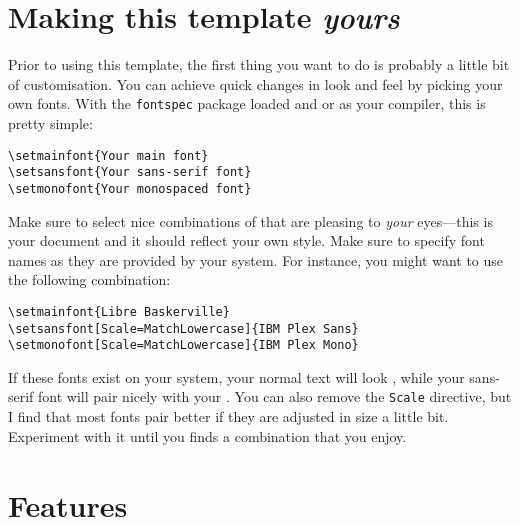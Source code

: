 \section{Making this template \emph{yours}}

Prior to using this template, the first thing you want to do is probably
a little bit of customisation. You can achieve quick changes in look and
feel by picking your own fonts. With the \verb|fontspec| package loaded
and  \XeLaTeX or \LuaLaTeX as your compiler, this is pretty simple:
%
\begin{verbatim}
\setmainfont{Your main font}
\setsansfont{Your sans-serif font}
\setmonofont{Your monospaced font}
\end{verbatim}
%
Make sure to select nice combinations of that are pleasing to
\emph{your} eyes---this is your document and it should reflect your own
style. Make sure to specify font names as they are provided by your
system. For instance, you might want to use the following combination:
%
\begin{verbatim}
\setmainfont{Libre Baskerville}
\setsansfont[Scale=MatchLowercase]{IBM Plex Sans}
\setmonofont[Scale=MatchLowercase]{IBM Plex Mono}
\end{verbatim}
%
\ifxetexorluatex
If these fonts exist on your system, your normal text will look
{}, while your sans-serif font {will 
pair nicely with your} {}.
%
You can also remove the \verb|Scale| directive, but I find that most
fonts pair better if they are adjusted in size a little bit. Experiment
with it until you finds a combination that you enjoy.
\fi

\section{Features}

